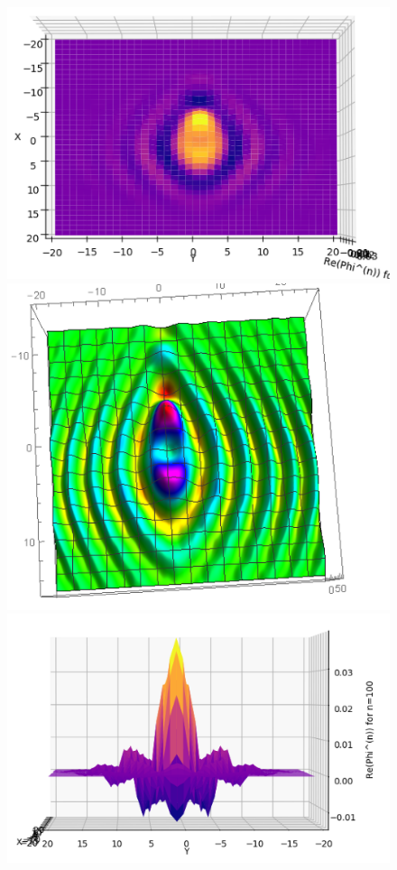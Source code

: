 \documentclass{article}
\theoremstyle{definition}
\begin{document}
\begin{figure}[!htb]
	\includegraphics[scale=0.55]{conv-2}
	\includegraphics[scale=0.5]{conv-3}\\
	\includegraphics[scale=0.4]{conv-4}

\end{figure}
\end{document}
